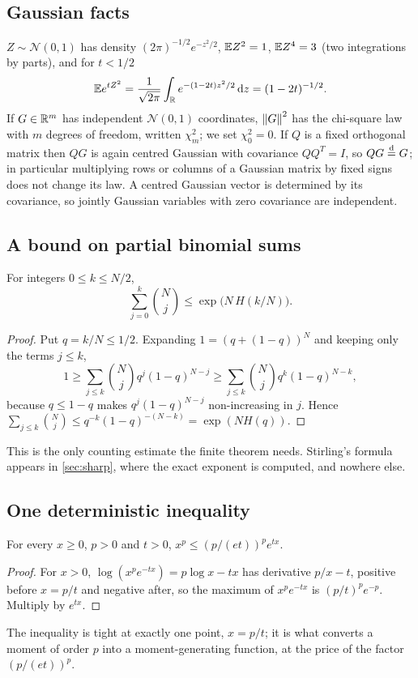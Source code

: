 \subsection{Gaussian facts}

$Z\sim\mathcal N(0,1)$ has density $(2\pi)^{-1/2}e^{-z^2/2}$, $\mathbb{E} Z^2=1$, $\mathbb{E} Z^4=3$ (two integrations by parts), and for $t<1/2$
\begin{equation}\label{eq:mgf}
\mathbb{E} e^{tZ^2}=\frac{1}{\sqrt{2\pi}}\int_{\mathbb{R}} e^{-(1-2t)z^2/2}\,\mathrm{d} z=(1-2t)^{-1/2}.
\end{equation}
If $G\in\mathbb{R}^m$ has independent $\mathcal N(0,1)$ coordinates, $\left\lVert G\right\rVert^2$ has the chi-square law with $m$ degrees of freedom, written $\chi^2_m$; we set $\chi^2_0=0$. If $Q$ is a fixed orthogonal matrix then $QG$ is again centred Gaussian with covariance $QQ^T=I$, so $QG\overset{\mathrm{d}}{=} G$; in particular multiplying rows or columns of a Gaussian matrix by fixed signs does not change its law. A centred Gaussian vector is determined by its covariance, so jointly Gaussian variables with zero covariance are independent.

\subsection{A bound on partial binomial sums}

\begin{lemma}\label{lem:entropy}
For integers $0\le k\le N/2$,
\[
\sum_{j=0}^{k}\binom Nj\le\exp\bigl(N\,H(k/N)\bigr).
\]
\end{lemma}

\begin{proof}
Put $q=k/N\le 1/2$. Expanding $1=(q+(1-q))^N$ and keeping only the terms $j\le k$,
\[
1\ge\sum_{j\le k}\binom Nj q^j(1-q)^{N-j}\ge\sum_{j\le k}\binom Nj q^k(1-q)^{N-k},
\]
because $q\le 1-q$ makes $q^j(1-q)^{N-j}$ non-increasing in $j$. Hence $\sum_{j\le k}\binom Nj\le q^{-k}(1-q)^{-(N-k)}=\exp(NH(q))$.
\end{proof}

This is the only counting estimate the finite theorem needs. Stirling's formula appears in \cref{sec:sharp}, where the exact exponent is computed, and nowhere else.

\subsection{One deterministic inequality}

\begin{lemma}\label{lem:xp}
For every $x\ge 0$, $p>0$ and $t>0$, $x^p\le(p/(et))^pe^{tx}$.
\end{lemma}

\begin{proof}
For $x>0$, $\log(x^pe^{-tx})=p\log x-tx$ has derivative $p/x-t$, positive before $x=p/t$ and negative after, so the maximum of $x^pe^{-tx}$ is $(p/t)^pe^{-p}$. Multiply by $e^{tx}$.
\end{proof}

The inequality is tight at exactly one point, $x=p/t$; it is what converts a moment of order $p$ into a moment-generating function, at the price of the factor $(p/(et))^p$.
